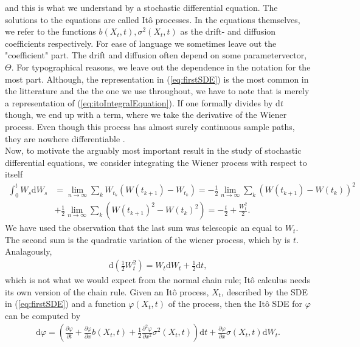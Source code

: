 and this is what we understand by a stochastic differential equation. The solutions to the equations are called Itô processes. In the equations themselves, we refer to the functions $b(X_t, t), \sigma^2(X_t, t)$ as the drift- and diffusion coefficients respectively. For ease of language we sometimes leave out the "coefficient" part. The drift and diffusion often depend on some parametervector, $\Theta$. For typographical reasons, we leave out the dependence in the notation for the most part. Although, the representation in (\ref{eq:firstSDE}) is the most common in the litterature and the the one we use throughout, we have to note that is merely a representation of (\ref{eq:itoIntegralEquation}). If one formally divides by $\mathrm{d}t$ though, we end up with a term, where we take the derivative of the Wiener process. Even though this process has almost surely continuous sample paths, they are nowhere differentiable \cite[theorem 11.22 and theorem 11.35]{Hansen2022}.\\
Now, to motivate the arguably most important result in the study of stochastic differential equations, we consider integrating the Wiener process with respect to itself
\begin{align}
    \int_0^t W_s \mathrm{d}W_s &= \lim_{n \to \infty}\sum_k W_{t_k}\left(W(t_{k + 1}) - W_{t_k}\right) = - \frac{1}{2}\lim_{n \to \infty}\sum_k \left(W(t_{k + 1}) - W(t_{k})\right)^2  \nonumber \\
    &+ \frac{1}{2}\lim_{n \to \infty}\sum_k\left(W(t_{k + 1})^2 - W(t_{k})^2\right) = -\frac{t}{2} + \frac{W_t^2}{2}.
\end{align}
We have used the observation that the last sum was telescopic an equal to $W_t$. The second sum is the quadratic variation of the wiener process, which by \cite[theorem 11.34]{Hansen2022} is $t$. Analagously,
\begin{align}
    \mathrm{d}\left(\frac{1}{2}W_t^2\right) = W_t\mathrm{d}W_t + \frac{1}{2}\mathrm{d}t,
\end{align}
which is not what we would expect from the normal chain rule; Itô calculus needs its own version of the chain rule. Given an Itô process, $X_t$, described by the SDE in (\ref{eq:firstSDE}) and a function $\varphi(X_t, t)$ of the process, then the Itô SDE for $\varphi$ can be computed by
\begin{align}
    \mathrm{d}\varphi = \left(\frac{\partial \varphi}{\partial t} + \frac{\partial\varphi}{\partial x}b(X_t, t) + \frac{1}{2} \frac{\partial^2 \varphi}{\partial x^2}\sigma^2(X_t, t) \right)\mathrm{d}t + \frac{\partial\varphi}{\partial x}\sigma(X_t, t) \mathrm{d}W_t.
\end{align}

